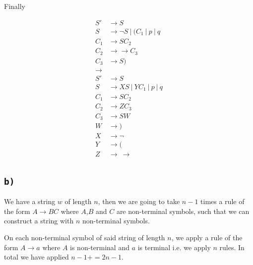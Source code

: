 \documentclass[a4paper,11pt]{report}
\begin{document}
Finally

\begin{align*}
  S' &\to S \\
  S &\to \neg S\ |\ (C_1     \ |\ p\ |\ q \\
  C_1 &\to S C_2 \\
  C_2 &\to \to C_3 \\
  C_3 &\to S ) \\
  \longrightarrow \\
  S' &\to S \\
  S &\to X S\ |\ Y C_1 \ |\ p\ |\ q \\
  C_1 &\to S C_2 \\
  C_2 &\to Z C_3 \\
  C_3 &\to S W \\
  W &\to ) \\
  X &\to \neg \\
  Y &\to ( \\
  Z &\to\ \to \\
\end{align*}

\subsection*{\texttt{b)}}

We have a string $w$ of length $n$, then we are going to take $n-1$ times a rule
of the form $A \to BC$ where $A$,$B$ and $C$ are non-terminal symbols, such that
we can construct a string with $n$ non-terminal symbols.

On each non-terminal symbol of said string of length $n$, we apply a rule of the
form $A \to a$ where $A$ is non-terminal and $a$ is terminal i.e. we apply $n$
rules. In total we have applied $n - 1 + = 2n-1$.
\end{document}
